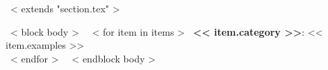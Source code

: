 ~< extends "section.tex" >~

~< block body >~
  ~< for item in items >~
    {\bf << item.category >>}: << item.examples >> \\
  ~< endfor >~
\vspace{-.15in}
~< endblock body >~
